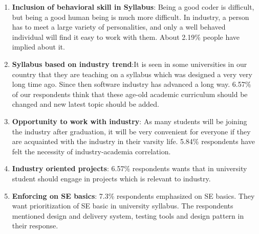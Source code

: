 \begin{enumerate}
    
    
    \item \textbf{Inclusion of behavioral skill in Syllabus}: Being a good coder is difficult, but being a good human being is much more difficult. In industry, a person has to meet a large variety of personalities, and only a well behaved individual will find it easy to work with them. About 2.19\% people have implied about it.
    
    
    
    \item \textbf{Syllabus based on industry trend}:It is seen in some universities in our country that they are teaching on a syllabus which was designed a very very long time ago. Since then software industry has advanced a long way. 6.57\% of our respondents think that these age-old academic curriculum should be changed and new latest topic should be added.
    
    
    
    \item \textbf{Opportunity to work with industry}:  As many students will be joining the industry after graduation, it will be very convenient for everyone if they are acquainted with the industry in their varsity life. 5.84\% respondents have felt the necessity of industry-academia correlation.
    
    
    
    \item \textbf{Industry oriented projects}: 6.57\% respondents wants that in university student should engage in projects which is relevant to industry.
    
    
    
    \item \textbf{Enforcing on SE basics}: 7.3\% respondents emphasized on SE  basics. They want prioritization of SE basic in university syllabus. The respondents mentioned design and delivery system, testing tools and design pattern in their response.
    

\end{enumerate}
